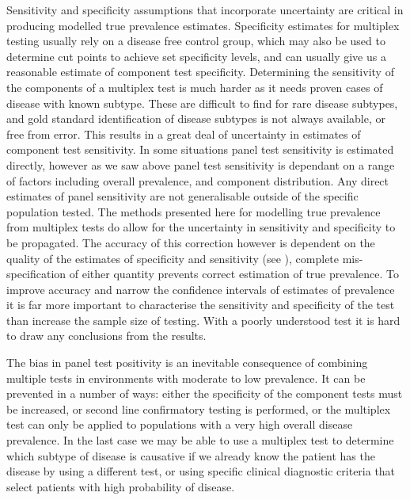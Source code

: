 \documentclass[10pt,letterpaper]{article}
\begin{document}
Sensitivity and specificity assumptions that incorporate uncertainty are critical in producing modelled true prevalence estimates. Specificity estimates for multiplex testing usually rely on a disease free control group, which may also be used to determine cut points to achieve set specificity levels, and can usually give us a reasonable estimate of component test specificity. Determining the sensitivity of the components of a multiplex test is much harder as it needs proven cases of disease with known subtype. These are difficult to find for rare disease subtypes, and gold standard identification of disease subtypes is not always available, or free from error\cite{loeffelholz2020,leber2018}. This results in a great deal of uncertainty in estimates of component test sensitivity. In some situations panel test sensitivity is estimated directly, however as we saw above panel test sensitivity is dependant on a range of factors including overall prevalence, and component distribution. Any direct estimates of panel sensitivity are not generalisable outside of the specific population tested. The methods presented here for modelling true prevalence from multiplex tests do allow for the uncertainty in sensitivity and specificity to be propagated. The accuracy of this correction however is dependent on the quality of the estimates of specificity and sensitivity (see ), complete mis-specification of either quantity prevents correct estimation of true prevalence. To improve accuracy and narrow the confidence intervals of estimates of prevalence it is far more important to characterise the sensitivity and specificity of the test than increase the sample size of testing. With a poorly understood test it is hard to draw any conclusions from the results.

The bias in panel test positivity is an inevitable consequence of combining multiple tests in environments with moderate to low prevalence. It can be prevented in a number of ways: either the specificity of the component tests must be increased, or second line confirmatory testing is performed, or the multiplex test can only be applied to populations with a very high overall disease prevalence. In the last case we may be able to use a multiplex test to determine which subtype of disease is causative if we already know the patient has the disease by using a different test, or using specific clinical diagnostic criteria that select patients with high probability of disease.
\end{document}
